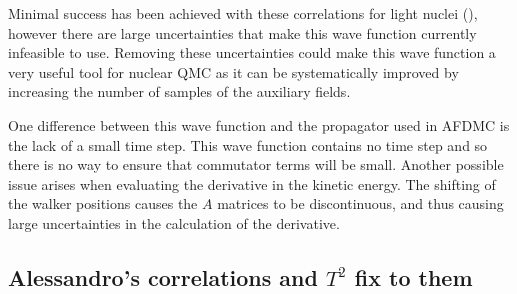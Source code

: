 Minimal success has been achieved with these correlations for light nuclei (\cite{bouadani2009_dissertation}), however there are large uncertainties that make this wave function currently infeasible to use. Removing these uncertainties could make this wave function a very useful tool for nuclear QMC as it can be systematically improved by increasing the number of samples of the auxiliary fields.

One difference between this wave function and the propagator used in AFDMC is the lack of a small time step. This wave function contains no time step and so there is no way to ensure that commutator terms will be small. Another possible issue arises when evaluating the derivative in the kinetic energy. The shifting of the walker positions causes the $A$ matrices to be discontinuous, and thus causing large uncertainties in the calculation of the derivative.

\subsection{Alessandro's correlations and $T^2$ fix to them}
